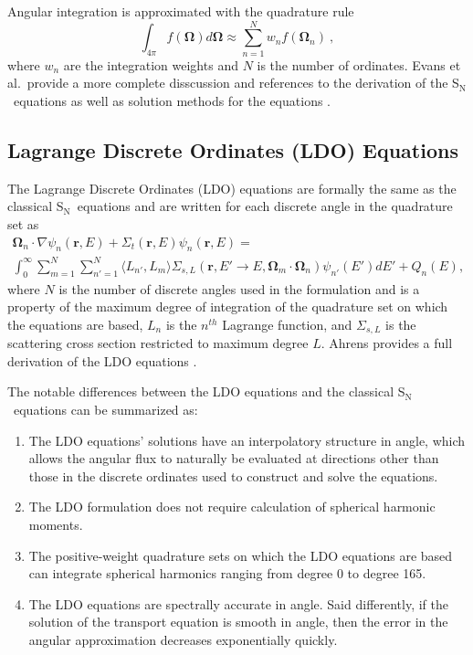 \documentclass{article} %
\newcommand{\bo}{\mathbf\Omega}
\newcommand{\vecr}{\textbf{r}}
\newcommand{\sn}{S$_\mathrm{N}$}
\begin{document}
Angular integration is approximated with the quadrature rule 
%
\begin{equation}
\int_{4\pi} f\left(\bo\right) d\bo \approx \sum_{n=1}^{N}w_n f\left(\bo_n\right)\:,
\label{eq:quadrule}
\end{equation}
%
where $w_n$ are the integration weights and $N$ is the number of ordinates.
Evans et al.\ provide a more complete disscussion and references to the
derivation of the \sn\ equations as well as solution methods for the equations
\cite{denovo}.

\subsection{Lagrange Discrete Ordinates (LDO) Equations}

The Lagrange Discrete Ordinates (LDO) equations are formally the same as the
classical \sn\ equations and are written for each discrete angle in the quadrature
set as
%
\begin{multline}
\bo_n\cdot\nabla\psi_{n}(\vecr,E) + 
\Sigma_{t}(\vecr,E)\psi_{n}(\vecr,E) = \\
\int_0^\infty\sum_{m=1}^{N}\sum_{n'=1}^{N}\langle L_{n'},L_{m}\rangle
\Sigma_{s,L}(\vecr,E'\rightarrow E,\bo_{m}\cdot\bo_n)\psi_{n'}(E')dE'
+ Q_{n}(E),
\end{multline}
%
where $N$ is the number of discrete angles used in the formulation
and is a property of the maximum degree of integration of the quadrature set
on which the equations are based, $L_n$ is the $n^{th}$ Lagrange function, and
$\Sigma_{s,L}$ is the scattering cross section restricted to maximum degree
$L$. Ahrens provides a full derivation of the LDO equations \cite{ahrens}.

The notable differences between the LDO equations and the classical \sn\
equations can be summarized as:

\begin{enumerate}
\item{The LDO equations' solutions have an interpolatory structure in angle,
      which allows the angular flux to naturally be evaluated at directions
      other than those in the discrete ordinates used to construct and solve
      the equations.}
\item{The LDO formulation does not require calculation of spherical harmonic
      moments.}
\item{The positive-weight quadrature sets on which the LDO equations are based
      can integrate spherical harmonics ranging from degree 0 to degree 165.}
\item{The LDO equations are spectrally accurate in angle. Said differently, if 
	  the solution of the transport equation is smooth in angle, then the error
	  in the angular approximation decreases exponentially quickly.}
\end{enumerate}
\end{document}
